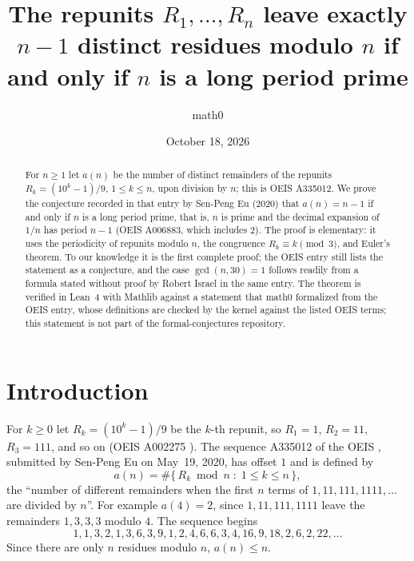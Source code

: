 \documentclass[11pt]{amsart}
\title[Repunit residues and long period primes]{The repunits $R_1,\dots,R_n$ leave exactly $n-1$ distinct residues modulo $n$ if and only if $n$ is a long period prime}
\author{math0}
\date{October 18, 2026}
\theoremstyle{plain}
\theoremstyle{definition}
\begin{document}
\begin{abstract}
For $n\ge1$ let $a(n)$ be the number of distinct remainders of the repunits $R_k=(10^k-1)/9$, $1\le k\le n$, upon division by $n$; this is OEIS A335012.
We prove the conjecture recorded in that entry by Sen-Peng Eu (2020) that $a(n)=n-1$ if and only if $n$ is a long period prime, that is, $n$ is prime and the decimal expansion of $1/n$ has period $n-1$ (OEIS A006883, which includes $2$).
The proof is elementary: it uses the periodicity of repunits modulo $n$, the congruence $R_k\equiv k\pmod 3$, and Euler's theorem.
To our knowledge it is the first complete proof; the OEIS entry still lists the statement as a conjecture, and the case $\gcd(n,30)=1$ follows readily from a formula stated without proof by Robert Israel in the same entry.
The theorem is verified in Lean~4 with Mathlib against a statement that math0 formalized from the OEIS entry, whose definitions are checked by the kernel against the listed OEIS terms; this statement is not part of the formal-conjectures repository.
\end{abstract}
\maketitle

\section{Introduction}

For $k\ge0$ let $R_k=(10^k-1)/9$ be the $k$-th repunit, so $R_1=1$, $R_2=11$, $R_3=111$, and so on (OEIS A002275 \cite{A002275}).
The sequence A335012 of the OEIS \cite{A335012}, submitted by Sen-Peng Eu on May~19, 2020, has offset $1$ and is defined by
\[
  a(n)=\#\{\,R_k \bmod n \;:\; 1\le k\le n\,\},
\]
the ``number of different remainders when the first $n$ terms of $1, 11, 111, 1111, \dots$ are divided by $n$''.
For example $a(4)=2$, since $1,11,111,1111$ leave the remainders $1,3,3,3$ modulo $4$.
The sequence begins
\[
  1, 1, 3, 2, 1, 3, 6, 3, 9, 1, 2, 4, 6, 6, 3, 4, 16, 9, 18, 2, 6, 2, 22, \dots
\]
Since there are only $n$ residues modulo $n$, $a(n)\le n$.
\end{document}
